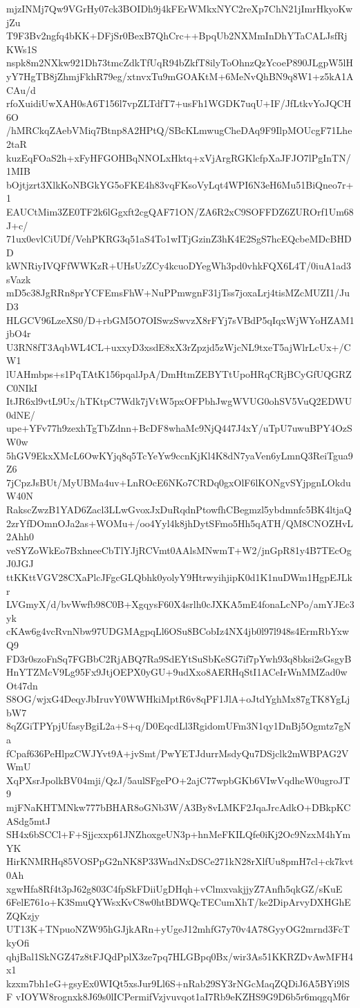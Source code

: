 mjzINMj7Qw9VGrHy07ck3BOIDh9j4kFErWMkxNYC2reXp7ChN21jImrHkyoKwjZu
T9F3Bv2ngfq4bKK+DFjSr0BexB7QhCrc++BpqUb2NXMmInDhYTaCALJsfRjKWs1S
nspk8m2NXkw921Dh73tmcZdkTfUqR94bZkfT8ilyToOhnzQzYcoeP890JLgpW5lH
yY7HgTB8jZhmjFkhR79eg/xtnvxTu9mGOAKtM+6MeNvQhBN9q8W1+z5kA1ACAu/d
rfoXuidiUwXAH0sA6T156l7vpZLTdfT7+usFh1WGDK7uqU+IF/JfLtkvYoJQCH6O
/hMRCkqZAebVMiq7Btnp8A2HPtQ/SBcKLmwugCheDAq9F9IlpMOUcgF71Lhe2taR
kuzEqFOaS2h+xFyHFGOHBqNNOLxHktq+xVjArgRGKlcfpXaJFJO7lPgInTN/1MIB
bOjtjzrt3XlkKoNBGkYG5oFKE4h83vqFKsoVyLqt4WPI6N3eH6Mu51BiQneo7r+1
EAUCtMim3ZE0TF2k6lGgxft2cgQAF71ON/ZA6R2xC9SOFFDZ6ZUROrf1Um68J+c/
71ux0evlCiUDf/VehPKRG3q51aS4To1wITjGzinZ3hK4E2SgS7hcEQcbeMDcBHDD
kWNRiyIVQFfWWKzR+UHsUzZCy4kcuoDYegWh3pd0vhkFQX6L4T/0iuA1ad3sVazk
mD5c38JgRRn8prYCFEmsFhW+NuPPmwgnF31jTss7joxaLrj4tisMZcMUZI1/JuD3
HLGCV96LzeXS0/D+rbGM5O7OISwzSwvzX8rFYj7sVBdP5qIqxWjWYoHZAM1jbO4r
U3RN8fT3AqbWL4CL+uxxyD3xsdE8xX3rZpzjd5zWjcNL9txeT5ajWlrLcUx+/CW1
lUAHmbps+s1PqTAtK156pqalJpA/DmHtmZEBYTtUpoHRqCRjBCyGfUQGRZC0NIkI
ItJR6xl9vtL9Ux/hTKtpC7Wdk7jVtW5pxOFPbhJwgWVUG0ohSV5VuQ2EDWU0dNE/
upe+YFv77h9zexhTgTbZdnn+BcDF8whaMc9NjQ447J4xY/uTpU7uwuBPY4OzSW0w
5hGV9EkxXMcL6OwKYjq8q5TcYeYw9ccnKjKl4K8dN7yaVen6yLmnQ3ReiTgua9Z6
7jCpzJsBUt/MyUBMa4uv+LnROcE6NKo7CRDq0gxOlF6lKONgvSYjpgnLOkduW40N
RakscZwzB1YAD6Zacl3LLwGvoxJxDuRqdnPtowfhCBegmzl5ybdmnfc5BK4ltjaQ
2zrYfDOmnOJa2as+WOMu+/oo4Yyl4k8jhDytSFmo5Hh5qATH/QM8CNOZHvL2Ahh0
veSYZoWkEo7BxhneeCbTlYJjRCVmt0AAlsMNwmT+W2/jnGpR81y4B7TEcOgJ0JGJ
ttKKttVGV28CXaPlcJFgcGLQbhk0yolyY9HtrwyihjipK0d1K1nuDWm1HgpEJLkr
LVGmyX/d/bvWwfb98C0B+XgqysF60X4srlh0cJXKA5mE4fonaLcNPo/amYJEc3yk
cKAw6g4vcRvnNbw97UDGMAgpqLl6OSu8BCobIz4NX4jb0l97l948s4ErmRbYxwQ9
FD3r0szoFnSq7FGBbC2RjABQ7Ra9SdEYtSuSbKeSG7if7pYwh93q8bksi2sGsgyB
HnYTZMcV9Lg95Fx9JtjOEPX0yGU+9udXxo8AERHqStI1ACeIrWnMMZad0wOt47dn
S8OG/wjxG4DeqyJbIruvY0WWHkiMptR6v8qPF1JlA+oJtdYghMx87gTK8YgLjbW7
8qZGiTPYpjUfasyBgiL2a+S+q/D0EqcdLl3RgidomUFm3N1qy1DnBj5Ogmtz7gNa
fCpaf636PeHlpzCWJYvt9A+jvSmt/PwYETJdurrMsdyQu7DSjclk2mWBPAG2VWmU
XqPXsrJpolkBV04mji/QzJ/5aulSFgePO+2ajC77wpbGKb6VIwVqdheW0ugroJT9
mjFNaKHTMNkw777bBHAR8oGNb3W/A3By8vLMKF2JqaJrcAdkO+DBkpKCASdg5mtJ
SH4x6bSCCl+F+Sjjcxxp61JNZhoxgeUN3p+hnMeFKILQfe0iKj2Oc9NzxM4hYmYK
HirKNMRHq85VOSPpG2nNK8P33WndNxDSCe271kN28rXlfUu8pmH7cl+ck7kvt0Ah
xgwHfa8Rf4t3pJ62g803C4fpSkFDiiUgDHqh+vClmxvakjjyZ7Anfh5qkGZ/sKuE
6FelE761o+K3SmuQYWsxKvC8w0htBDWQcTECumXhT/ke2DipArvyDXHGhEZQKzjy
UT13K+TNpuoNZW95hGJjkARn+yUgeJ12mhfG7y70v4A78GyyOG2mrnd3FcTkyOfi
qhjBal1SkNGZ47z8tFJQdPplX3ze7pq7HLGBpq0Bx/wir3As51KKRZDvAwMFH4x1
kzxm7bh1eG+gsyEx0WIQt5xsJur9Ll6S+nRab29SY3rNGcMaqZQDiJ6A5BYi9lSF
vIOYW8rognxk8J69s0lICPermifVzjvuvqot1aI7Rb9eKZHS9G9D6b5r6mqgqM6r
